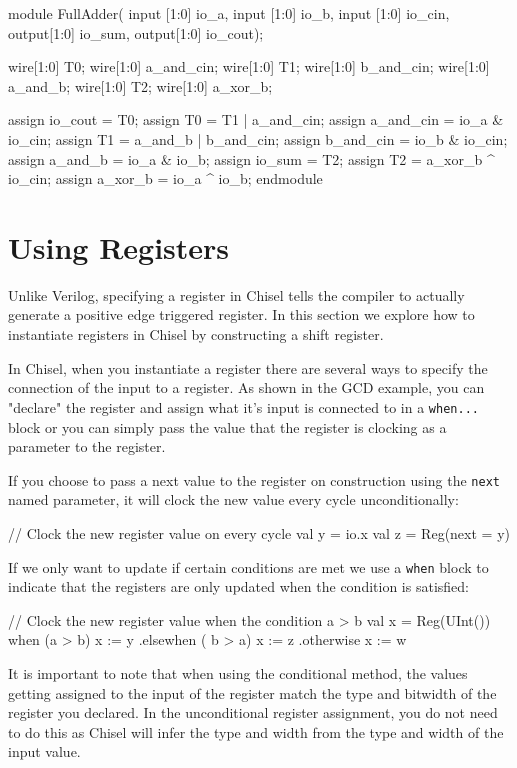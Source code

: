 \documentclass[twocolumn, 10pt]{article}
\begin{document}
\begin{bash}
module FullAdder(
    input [1:0] io_a,
    input [1:0] io_b,
    input [1:0] io_cin,
    output[1:0] io_sum,
    output[1:0] io_cout);

  wire[1:0] T0;
  wire[1:0] a_and_cin;
  wire[1:0] T1;
  wire[1:0] b_and_cin;
  wire[1:0] a_and_b;
  wire[1:0] T2;
  wire[1:0] a_xor_b;

  assign io_cout = T0;
  assign T0 = T1 | a_and_cin;
  assign a_and_cin = io_a & io_cin;
  assign T1 = a_and_b | b_and_cin;
  assign b_and_cin = io_b & io_cin;
  assign a_and_b = io_a & io_b;
  assign io_sum = T2;
  assign T2 = a_xor_b ^ io_cin;
  assign a_xor_b = io_a ^ io_b;
endmodule
\end{bash}

\section{Using Registers}

Unlike Verilog, specifying a register in Chisel tells the compiler to actually generate a positive edge triggered register. In this section we explore how to instantiate registers in Chisel by constructing a shift register.

In Chisel, when you instantiate a register there are several ways to specify the connection of the input to a register. As shown in the GCD example, you can "declare" the register and assign what it's input is connected to in a \verb+when...+ block or you can simply pass the value that the register is clocking as a parameter to the register.

If you choose to pass a next value to the register on construction using the \verb+next+ named parameter, it will clock the new value every cycle unconditionally:

\begin{scala}
// Clock the new register value on every cycle
val y = io.x
val z = Reg(next = y)
\end{scala}

If we only want to update if certain conditions are met we use a \verb+when+ block to indicate that the registers are only updated when the condition is satisfied:

\begin{scala}
// Clock the new register value when the condition a > b
val x = Reg(UInt())
when (a > b) { x := y }
.elsewhen ( b > a) {x := z}
.otherwise { x := w}
\end{scala}

It is important to note that when using the conditional method, the values getting assigned to the input of the register match the type and bitwidth of the register you declared. In the unconditional register assignment, you do not need to do this as Chisel will infer the type and width from the type and width of the input value.
\end{document}
